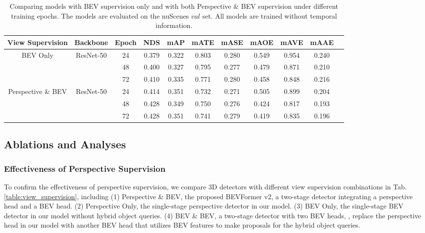 \documentclass[10pt,twocolumn,letterpaper]{article}
\begin{document}
\renewcommand{\arraystretch}{1.1}
\begin{table*}[t]
    \caption{Comparing models with BEV supervision only and with both Perspective \& BEV supervision under different training epochs. The models are evaluated on the nuScenes $val$ set. All models are trained without temporal information.}
    \label{table:long_schedule}
    \centering

    \begin{tabular}{c|c|c|cc|cccccc}
        \toprule
        View Supervision & Backbone & Epoch  & NDS & mAP & mATE & mASE & mAOE & mAVE & mAAE   \\ 
        \midrule 
        \multirow{3}{*}{BEV Only} & \multirow{3}{*}{ResNet-50} & 24 & 0.379 & 0.322 & 0.803 & 0.280 & 0.549 & 0.954 & 0.240 \\ 
         &  & 48 & 0.400 & 0.327 & 0.795 & 0.277 & 0.479 & 0.871 & 0.210 \\ 
         &  & 72 & 0.410 & 0.335 & 0.771 & 0.280 & 0.458 & 0.848 & 0.216 \\ 
        \midrule
        \multirow{3}{*}{Perspective \& BEV} & \multirow{3}{*}{ResNet-50} & 24 &  0.414 & 0.351 & 0.732 & 0.271 & 0.505 & 0.899 & 0.204 \\ 
         &  & 48 & 0.428 & 0.349 & 0.750 & 0.276 & 0.424 & 0.817 & 0.193 \\ 
         &  & 72 & 0.428 & 0.351 & 0.741 & 0.279 & 0.419 & 0.835 & 0.196 \\ 
        \midrule
        \bottomrule
    \end{tabular}
\end{table*} 

\subsection{Ablations and Analyses}
\subsubsection{Effectiveness of Perspective Supervision} 
To confirm the effectiveness of perspective supervision, we compare 3D detectors with different view supervision combinations in Tab. \ref{table:view_supervision}, including 
(1) Perspective \& BEV, the proposed BEVFormer v2, a two-stage detector integrating a perspective head and a BEV head. 
(2) Perspective Only, the single-stage perspective detector in our model. 
(3) BEV Only, the single-stage BEV detector in our model without hybrid object queries. 
(4) BEV \& BEV, a two-stage detector with two BEV heads, \ie, replace the perspective head in our model with another BEV head that utilizes BEV features to make proposals for the hybrid object queries. 
\end{document}
